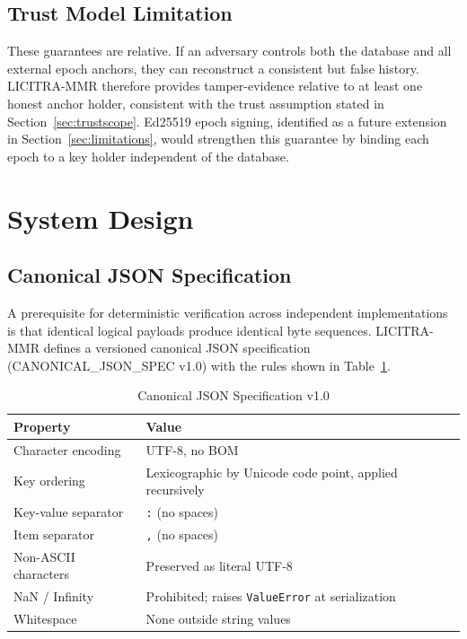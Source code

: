\documentclass{article}
\begin{document}
\subsection{Trust Model Limitation}

These guarantees are relative. If an adversary controls both the database and
all external epoch anchors, they can reconstruct a consistent but false history.
LICITRA-MMR therefore provides tamper-evidence relative to at least one honest
anchor holder, consistent with the trust assumption stated in
Section~\ref{sec:trustscope}. Ed25519 epoch signing, identified as a future
extension in Section~\ref{sec:limitations}, would strengthen this guarantee by
binding each epoch to a key holder independent of the database.

\section{System Design}

\subsection{Canonical JSON Specification}

A prerequisite for deterministic verification across independent implementations
is that identical logical payloads produce identical byte sequences. LICITRA-MMR
defines a versioned canonical JSON specification (CANONICAL\_JSON\_SPEC v1.0)
with the rules shown in Table~\ref{tab:canon}.

\begin{table}[H]
\centering
\caption{Canonical JSON Specification v1.0}
\label{tab:canon}
\begin{tabular}{lp{6.5cm}}
\toprule
Property & Value \\
\midrule
Character encoding   & UTF-8, no BOM \\
Key ordering         & Lexicographic by Unicode code point, applied recursively \\
Key-value separator  & \texttt{:} (no spaces) \\
Item separator       & \texttt{,} (no spaces) \\
Non-ASCII characters & Preserved as literal UTF-8 \\
NaN / Infinity       & Prohibited; raises \texttt{ValueError} at serialization \\
Whitespace           & None outside string values \\
\bottomrule
\end{tabular}
\end{table}
\end{document}
